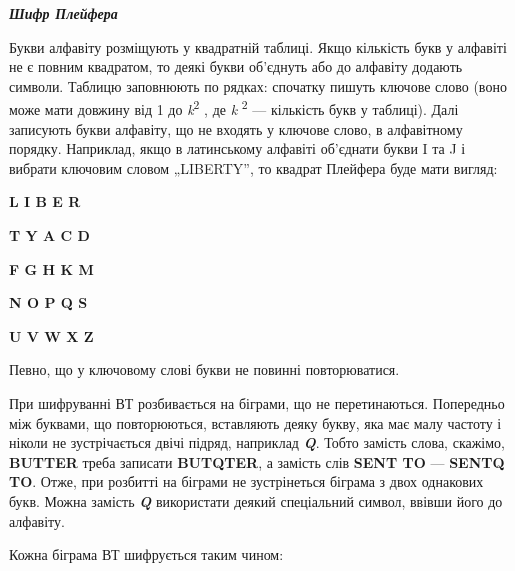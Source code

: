 \bigskip

{\centering\bfseries\itshape
Шифр Плейфера
\par}


\bigskip


\bigskip

Букви алфавіту розміщують у квадратній таблиці. Якщо кількість букв у алфавіті
не є повним квадратом, то деякі букви об’єднуть або до алфавіту додають
символи. Таблицю заповнюють по рядках: спочатку пишуть ключове слово (воно може
мати довжину від 1 до \textit{k}\textsuperscript{2} , де
\textit{k}\textsuperscript{ 2} --- кількість букв у таблиці). Далі записують
букви алфавіту, що не входять у ключове слово, в алфавітному порядку.
Наприклад, якщо в латинському алфавіті об’єднати букви I та J і вибрати
ключовим словом „LIBERTY”, то квадрат Плейфера буде мати вигляд:


\bigskip

{\centering\bfseries
L  I  B  E  R
\par}

{\centering\bfseries
T  Y  A  C  D
\par}

{\centering\bfseries
F  G  H  K  M
\par}

{\centering\bfseries
N  O  P  Q  S
\par}

{\centering\bfseries
U  V  W  X  Z
\par}


\bigskip


\bigskip

Певно, що у ключовому слові букви не повинні повторюватися.

При шифруванні ВТ розбивається на біграми, що не перетинаються. Попередньо між
буквами, що повторюються, вставляють деяку букву, яка має малу частоту і ніколи
не зустрічається двічі підряд, наприклад \textbf{\textit{Q}}. Тобто замість
слова, скажімо, \textbf{BUTTER} треба записати \textbf{BUTQTER}, а замість слів
\textbf{SENT TO}  --- \textbf{SENTQ TO}. Отже, при розбитті на біграми не
зустрінеться біграма з двох однакових букв. Можна замість \textbf{\textit{Q
}}використати деякий спеціальний символ, ввівши його до алфавіту.

Кожна біграма ВТ шифрується таким чином:

